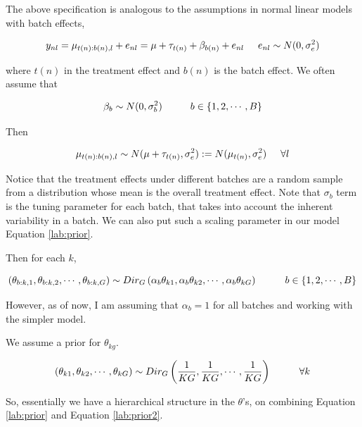 \documentclass[]{article}
\begin{document}
The above specification is analogous to the assumptions in normal linear
models with batch effects,

\[ y_{nl} = \mu_{t(n):b(n),l} + e_{nl} = \mu + \tau_{t(n)} + \beta_{b(n)} + e_{nl} \hspace{0.5 cm} e_{nl} \sim N(0,\sigma^2_{e}) \]

where \(t(n)\) in the treatment effect and \(b(n)\) is the batch effect.
We often assume that

\[ \beta_{b} \sim N(0, \sigma^{2}_{b}) \hspace{1 cm} b \in \{1,2, \cdots, B \} \]

Then

\[ \mu_{t(n):b(n),l} \sim N (\mu + \tau_{t(n)}, \sigma^{2}_{e})  : = N(\mu_{t(n)}, \sigma^{2}_{e}) \hspace{0.5 cm} \forall l\]

Notice that the treatment effects under different batches are a random
sample from a distribution whose mean is the overall treatment effect.
Note that \(\sigma_b\) term is the tuning parameter for each batch, that
takes into account the inherent variability in a batch. We can also put
such a scaling parameter in our model Equation \ref{lab:prior}.

Then for each \(k\),

\[ (\theta_{b:k, 1}, \theta_{b:k, 2}, \cdots, \theta_{b:k, G}) \sim Dir_{G} \left ( \alpha_{b} \theta_{k1}, \alpha_{b} \theta_{k2}, \cdots, \alpha_{b} \theta_{kG} \right ) \hspace{1 cm} b \in \{1,2, \cdots, B \} \]

However, as of now, I am assuming that \(\alpha_b =1\) for all batches
and working with the simpler model.

We assume a prior for \(\theta_{kg}\).

\begin{equation}
(\theta_{k1}, \theta_{k2}, \cdots, \theta_{kG}) \sim Dir_{G} \left ( \frac{1}{KG}, \frac{1}{KG}, \cdots, \frac{1}{KG} \right) \hspace{1 cm} \forall k
\label{lab:prior2}
\end{equation}

So, essentially we have a hierarchical structure in the \(\theta\)'s, on
combining Equation \ref{lab:prior} and Equation \ref{lab:prior2}.
\end{document}
